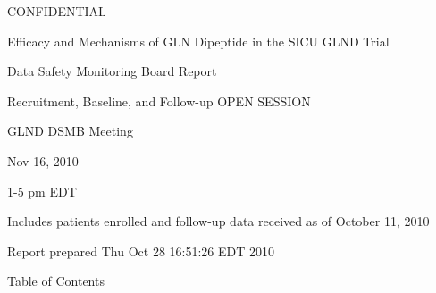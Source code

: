 \documentclass[dvips,10pt]{article}
\begin{document}
\vspace*{1in}
\begin{center}
{\Huge{CONFIDENTIAL}}
\end{center}
\vspace*{0.5in}
\begin{center}
{\Huge{Efficacy and Mechanisms of GLN Dipeptide in the SICU GLND Trial}}
\end{center}
\vspace*{0.5in}
\begin{center}
{\Huge{Data Safety Monitoring Board Report}}
\end{center}
\vspace*{0.25in}
\begin{center}
{\Huge{
Recruitment, Baseline, and Follow-up  OPEN SESSION
}}
\end{center}
\vspace*{1in}
\begin{center}
{\Huge{GLND DSMB Meeting}}
\end{center}
\begin{center}
{\Huge{
 Nov 16, 2010
}}
\end{center}
\begin{center}
{\Huge{1-5 pm EDT}}
\end{center}
\vspace*{1in}
\begin{center}
\noindent
{\Large{Includes patients enrolled and follow-up data received as of October 11, 2010}}
\end{center}
\vspace*{0.5in}
\begin{center}
{\Large{Report prepared  Thu Oct 28 16:51:26 EDT 2010 }}
\end{center}
\clearpage
\vspace*{1in}
\begin{center}
{\Huge{Table of Contents}}
\end{center}
\listoftables
\listoffigures
\clearpage
\end{document}
